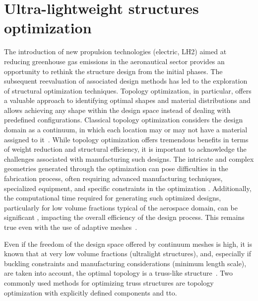 



\section{Ultra-lightweight structures optimization}
The introduction of new propulsion technologies (electric, LH2) aimed at reducing greenhouse gas emissions in the aeronautical sector provides an opportunity to rethink the structure design from the initial phases. The subsequent reevaluation of associated design methods has led to the exploration of structural optimization techniques. Topology optimization, in particular, offers a valuable approach to identifying optimal shapes and material distributions and allows achieving any shape within the design space instead of dealing with predefined configurations. Classical topology optimization considers the design domain as a continuum, in which each location may or may not have a material assigned to it~\cite{bendsoe_optimal_1989}. While topology optimization offers tremendous benefits in terms of weight reduction and structural efficiency, it is important to acknowledge the challenges associated with manufacturing such designs. The intricate and complex geometries generated through the optimization can pose difficulties in the fabrication process, often requiring advanced manufacturing techniques, specialized equipment, and specific constraints in the optimization \cite{zhou_progress_2002,brackett_topology_2011,liu_current_2018}. Additionally, the computational time required for generating such optimized designs, particularly for low volume fractions typical of the aerospace domain, can be significant \cite{aage_giga-voxel_2017}, impacting the overall efficiency of the design process. This remains true even with the use of adaptive meshes~\cite{salazar_de_troya_adaptive_2018, zhang_adaptive_2020}.

Even if the freedom of the design space offered by continuum meshes is high, it is known that at very low volume fractions (\eg ultralight structures), and, especially if buckling constraints and manufacturing considerations (\eg minimum length scale), are taken into account, the optimal topology is a truss-like structure~\cite{sigmund_non-optimality_2016}. Two commonly used methods for optimizing truss structures are topology optimization with explicitly defined components and \gls{tto}. 


